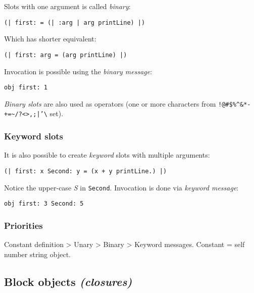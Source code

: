 \documentclass[10pt]{article}
\begin{document}
\begin{multicols*}{3}
Slots with one argument is called \textit{binary}:

\begin{lstlisting}
(| first: = (| :arg | arg printLine) |)
\end{lstlisting}

Which has shorter equivalent:

\begin{lstlisting}
(| first: arg = (arg printLine) |)
\end{lstlisting}

Invocation is possible using the \textit{binary message}:

\begin{lstlisting}
obj first: 1
\end{lstlisting}

\textit{Binary slots} are also used as operators (one or more characters from \texttt{!@\#\$\%\^{}\&*-+=\textasciitilde/?\textless\textgreater,;|'\textbackslash{}} set).



\subsubsection{Keyword slots}

It is also possible to create \textit{keyword} slots with multiple arguments:

\begin{lstlisting}
(| first: x Second: y = (x + y printLine.) |)
\end{lstlisting}

Notice the upper-case \textit{S} in \texttt{Second}. Invocation is done via \textit{keyword message}:

\begin{lstlisting}
obj first: 3 Second: 5
\end{lstlisting}



\subsubsection{Priorities}

Constant definition \textgreater{} Unary \textgreater{} Binary \textgreater{} Keyword messages. Constant = self \textbar{} number \textbar{} string \textbar{} object.




\subsection{Block objects \textit{(closures)}}


\end{multicols*}
\end{document}
